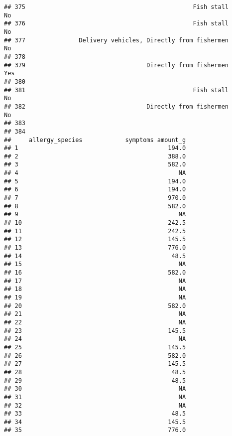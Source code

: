 \documentclass[
]{article}
\begin{document}
\begin{verbatim}
## 375                                               Fish stall        No
## 376                                               Fish stall        No
## 377               Delivery vehicles, Directly from fishermen        No
## 378                                                                   
## 379                                  Directly from fishermen       Yes
## 380                                                                   
## 381                                               Fish stall        No
## 382                                  Directly from fishermen        No
## 383                                                                   
## 384                                                                   
##     allergy_species            symptoms amount_g
## 1                                          194.0
## 2                                          388.0
## 3                                          582.0
## 4                                             NA
## 5                                          194.0
## 6                                          194.0
## 7                                          970.0
## 8                                          582.0
## 9                                             NA
## 10                                         242.5
## 11                                         242.5
## 12                                         145.5
## 13                                         776.0
## 14                                          48.5
## 15                                            NA
## 16                                         582.0
## 17                                            NA
## 18                                            NA
## 19                                            NA
## 20                                         582.0
## 21                                            NA
## 22                                            NA
## 23                                         145.5
## 24                                            NA
## 25                                         145.5
## 26                                         582.0
## 27                                         145.5
## 28                                          48.5
## 29                                          48.5
## 30                                            NA
## 31                                            NA
## 32                                            NA
## 33                                          48.5
## 34                                         145.5
## 35                                         776.0

\end{verbatim}
\end{document}
